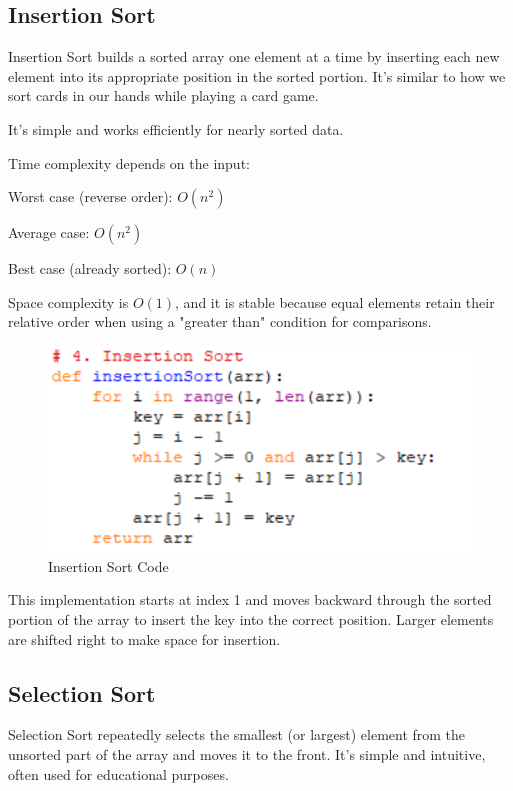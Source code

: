 \documentclass[sigconf]{acmart}
\begin{document}
\subsection{Insertion Sort}
Insertion Sort builds a sorted array one element at a time by inserting each new element into its appropriate position in the sorted portion. It's similar to how we sort cards in our hands while playing a card game.

It's simple and works efficiently for nearly sorted data.

Time complexity depends on the input:

Worst case (reverse order): $O(n^2)$

Average case: $O(n^2)$

Best case (already sorted): $O(n)$

Space complexity is $O(1)$, and it is stable because equal elements retain their relative order when using a "greater than" condition for comparisons.

\begin{figure}[t]
\centering
\includegraphics[width=0.85\linewidth]{figures/004.pdf}
\vspace{-0.3cm}
\caption{Insertion Sort Code}  
\vspace{-0.35cm}
\label{fig:proportion}
\end{figure}

This implementation starts at index 1 and moves backward through the sorted portion of the array to insert the key into the correct position. Larger elements are shifted right to make space for insertion.

\subsection{Selection Sort}
Selection Sort repeatedly selects the smallest (or largest) element from the unsorted part of the array and moves it to the front. It's simple and intuitive, often used for educational purposes.
\end{document}
